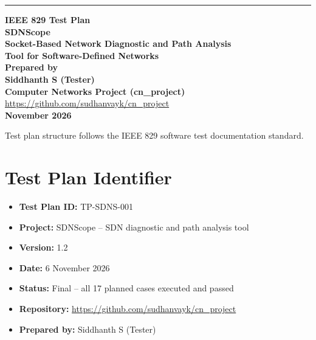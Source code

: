 \documentclass[11pt,a4paper]{article}
\begin{document}
\begin{titlepage}
\vspace*{2cm}
\noindent\rule{\textwidth}{1.5pt}
\vspace{1.2cm}

\begin{flushright}
{\fontsize{26}{32}\selectfont\textbf{IEEE 829 Test Plan}}\\[20pt]
{\fontsize{22}{28}\selectfont\textbf{SDNScope}}\\[8pt]
{\fontsize{14}{18}\selectfont\textbf{Socket-Based Network Diagnostic and Path Analysis}}\\[4pt]
{\fontsize{14}{18}\selectfont\textbf{Tool for Software-Defined Networks}}\\[30pt]
{\fontsize{13}{16}\selectfont\textbf{Prepared by}}\\[4pt]
{\fontsize{13}{16}\selectfont\textbf{Siddhanth S (Tester)}}\\[22pt]
{\fontsize{13}{16}\selectfont\textbf{Computer Networks Project (cn\_project)}}\\[8pt]
{\fontsize{12}{15}\selectfont\url{https://github.com/sudhanvayk/cn_project}}\\[20pt]
{\fontsize{13}{16}\selectfont\textbf{November 2026}}
\end{flushright}

\vfill
\begin{center}
{\footnotesize Test plan structure follows the IEEE 829 software test documentation standard.}
\end{center}
\end{titlepage}
\setcounter{page}{2}

\newpage

\section{Test Plan Identifier}
\begin{itemize}
  \item \textbf{Test Plan ID:} TP-SDNS-001
  \item \textbf{Project:} SDNScope -- SDN diagnostic and path analysis tool
  \item \textbf{Version:} 1.2
  \item \textbf{Date:} 6 November 2026
  \item \textbf{Status:} Final -- all 17 planned cases executed and passed
  \item \textbf{Repository:} \url{https://github.com/sudhanvayk/cn_project}
  \item \textbf{Prepared by:} Siddhanth S (Tester)
\end{itemize}
\end{document}
